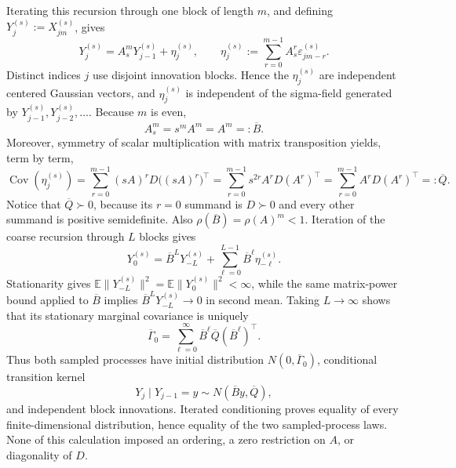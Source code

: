 Iterating this recursion through one block of length \(m\), and defining \(Y_j^{(s)}:=X_{jm}^{(s)}\), gives
\[
 Y_j^{(s)}=A_s^mY_{j-1}^{(s)}+\eta_j^{(s)},
 \qquad
 \eta_j^{(s)}:=\sum_{r=0}^{m-1}A_s^r\varepsilon_{jm-r}^{(s)}.
\]
Distinct indices \(j\) use disjoint innovation blocks.  Hence the \(\eta_j^{(s)}\) are independent centered Gaussian vectors, and \(\eta_j^{(s)}\) is independent of the sigma-field generated by \(Y_{j-1}^{(s)},Y_{j-2}^{(s)},\ldots\).  Because \(m\) is even,
\[
 A_s^m=s^mA^m=A^m=:\overline B.
\]
Moreover, symmetry of scalar multiplication with matrix transposition yields, term by term,
\[
 \operatorname{Cov}(\eta_j^{(s)})
 =\sum_{r=0}^{m-1}(sA)^rD\bigl((sA)^r\bigr)^\top
 =\sum_{r=0}^{m-1}s^{2r}A^rD(A^r)^\top
 =\sum_{r=0}^{m-1}A^rD(A^r)^\top
 =:\overline Q.
\]
Notice that \(\overline Q\succ0\), because its \(r=0\) summand is \(D\succ0\) and every other summand is positive semidefinite.  Also \(\rho(\overline B)=\rho(A)^m<1\).  Iteration of the coarse recursion through \(L\) blocks gives
\[
 Y_0^{(s)}=\overline B^L Y_{-L}^{(s)}
 +\sum_{\ell=0}^{L-1}\overline B^\ell\eta_{-\ell}^{(s)}.
\]
Stationarity gives \(\mathbb E\lVert Y_{-L}^{(s)}\rVert^2=\mathbb E\lVert Y_0^{(s)}\rVert^2<\infty\), while the same matrix-power bound applied to \(\overline B\) implies \(\overline B^L Y_{-L}^{(s)}\to0\) in second mean.  Taking \(L\to\infty\) shows that its stationary marginal covariance is uniquely
\[
 \overline\Gamma_0
 =\sum_{\ell=0}^{\infty}\overline B^\ell
      \overline Q(\overline B^\ell)^\top.
\]
Thus both sampled processes have initial distribution \(N(0,\overline\Gamma_0)\), conditional transition kernel
\[
 Y_j\mid Y_{j-1}=y\sim N(\overline B y,\overline Q),
\]
and independent block innovations.  Iterated conditioning proves equality of every finite-dimensional distribution, hence equality of the two sampled-process laws.  None of this calculation imposed an ordering, a zero restriction on \(A\), or diagonality of \(D\).

